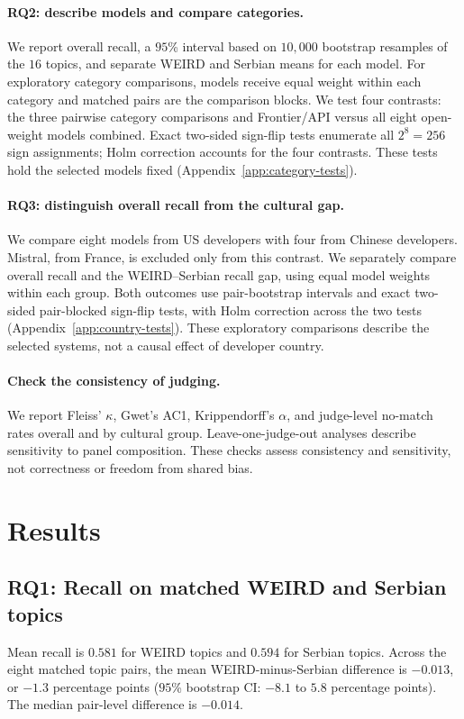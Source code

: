 \documentclass[11pt,a4paper]{article}
\begin{document}
\paragraph{RQ2: describe models and compare categories.}
We report overall recall, a $95$\% interval based on $10{,}000$ bootstrap resamples of the $16$ topics, and separate WEIRD and Serbian means for each model. For exploratory category comparisons, models receive equal weight within each category and matched pairs are the comparison blocks. We test four contrasts: the three pairwise category comparisons and Frontier/API versus all eight open-weight models combined. Exact two-sided sign-flip tests enumerate all $2^8=256$ sign assignments; Holm correction accounts for the four contrasts. These tests hold the selected models fixed (Appendix~\ref{app:category-tests}).

\paragraph{RQ3: distinguish overall recall from the cultural gap.}
We compare eight models from US developers with four from Chinese developers. Mistral, from France, is excluded only from this contrast. We separately compare overall recall and the WEIRD--Serbian recall gap, using equal model weights within each group. Both outcomes use pair-bootstrap intervals and exact two-sided pair-blocked sign-flip tests, with Holm correction across the two tests (Appendix~\ref{app:country-tests}). These exploratory comparisons describe the selected systems, not a causal effect of developer country.

\paragraph{Check the consistency of judging.}
We report Fleiss' $\kappa$, Gwet's AC1, Krippendorff's $\alpha$, and judge-level no-match rates overall and by cultural group. Leave-one-judge-out analyses describe sensitivity to panel composition. These checks assess consistency and sensitivity, not correctness or freedom from shared bias.


\section{Results}
\subsection{RQ1: Recall on matched WEIRD and Serbian topics}
\label{sec:rq1}
Mean recall is $0.581$ for WEIRD topics and $0.594$ for Serbian topics. Across the eight matched topic pairs, the mean WEIRD-minus-Serbian difference is $-0.013$, or $-1.3$ percentage points ($95$\% bootstrap CI: $-8.1$ to $5.8$ percentage points). The median pair-level difference is $-0.014$.
\end{document}
